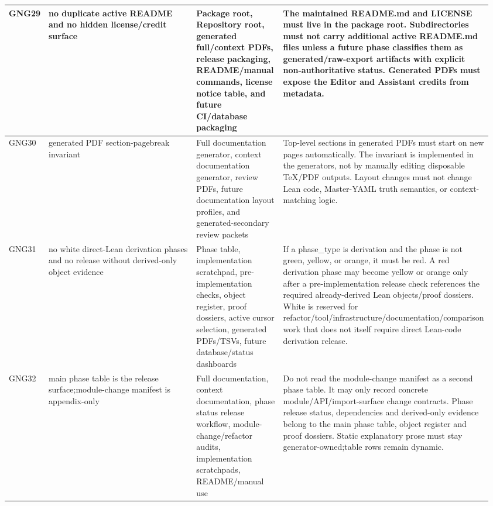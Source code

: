 \begin{longtable}{L{0.045\linewidth} L{0.345\linewidth} L{0.185\linewidth} L{0.39\linewidth}}
\hline
\addlinespace[0.24em]
GNG29 & no duplicate active README and no hidden license/\allowbreak{}credit surface & Package root, Repository root, generated full/\allowbreak{}context PDFs, release packaging, README/\allowbreak{}manual commands, license notice table, and future CI/\allowbreak{}database packaging & The maintained README.md and LICENSE must live in the package root. Subdirectories must not carry additional active README.md files unless a future phase classifies them as generated/\allowbreak{}raw-export artifacts with explicit non-authoritative status. Generated PDFs must expose the Editor and Assistant credits from metadata.\\
\hline
\addlinespace[0.24em]
GNG30 & generated PDF section-pagebreak invariant & Full documentation generator, context documentation generator, review PDFs, future documentation layout profiles, and generated-secondary review packets & Top-level sections in generated PDFs must start on new pages automatically. The invariant is implemented in the generators, not by manually editing disposable TeX/\allowbreak{}PDF outputs. Layout changes must not change Lean code, Master-YAML truth semantics, or context-matching logic.\\
\hline
\addlinespace[0.24em]
GNG31 & no white direct-Lean derivation phases and no release without derived-only object evidence & Phase table, implementation scratchpad, pre-implementation checks, object register, proof dossiers, active cursor selection, generated PDFs/\allowbreak{}TSVs, future database/\allowbreak{}status dashboards & If a phase\_type is derivation and the phase is not green, yellow, or orange, it must be red. A red derivation phase may become yellow or orange only after a pre-implementation release check references the required already-derived Lean objects/\allowbreak{}proof dossiers. White is reserved for refactor/\allowbreak{}tool/\allowbreak{}infrastructure/\allowbreak{}documentation/\allowbreak{}comparison work that does not itself require direct Lean-code derivation release.\\
\hline
\addlinespace[0.24em]
GNG32 & main phase table is the release surface;\newline module-change manifest is appendix-only & Full documentation, context documentation, phase status release workflow, module-change/\allowbreak{}refactor audits, implementation scratchpads, README/\allowbreak{}manual use & Do not read the module-change manifest as a second phase table. It may only record concrete module/\allowbreak{}API/\allowbreak{}import-surface change contracts. Phase release status, dependencies and derived-only evidence belong to the main phase table, object register and proof dossiers. Static explanatory prose must stay generator-owned;\newline table rows remain dynamic.\\

\end{longtable}
